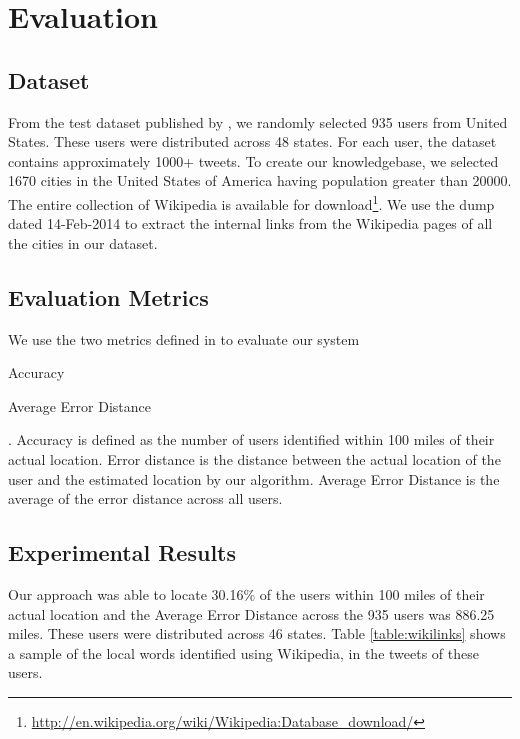 
\section{Evaluation}
\label{sec:evaluation}

\subsection{Dataset}
From the test dataset published by \cite{cheng2010you}, we randomly selected 935 users from United States. These users were distributed across 48 states. For each user, the dataset contains approximately 1000+ tweets. To create our knowledgebase, we selected 1670 cities in the United States of America having population greater than 20000. The entire collection of Wikipedia is available for download\footnote{\url{http://en.wikipedia.org/wiki/Wikipedia:Database_download/}}. We use the dump dated 14-Feb-2014 to extract the internal links from the Wikipedia pages of all the cities in our dataset. 

\subsection{Evaluation Metrics}
We use the two metrics defined in \cite{cheng2010you} to evaluate our system \begin{inparaenum}[(1)] \item Accuracy \item Average Error Distance \end{inparaenum}. 
Accuracy is defined as the number of users identified within 100 miles of their actual location.
Error distance is the distance between the actual location of the user and the estimated location by our algorithm. Average Error Distance is the average of the error distance across all users.

\subsection{Experimental Results}
Our approach was able to locate 30.16\% of the users within 100 miles of their actual location and the Average Error Distance across the 935 users was 886.25 miles. These users were distributed across 46 states. Table \ref{table:wikilinks} shows a sample of the local words identified using Wikipedia, in the tweets of these users.

